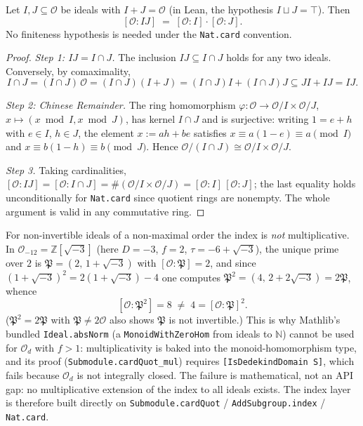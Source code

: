 \begin{proposition}\label{infra-index-mul}
  \leanok
  Let $I, J \subseteq \mathcal{O}$ be ideals with $I + J = \mathcal{O}$ (in Lean, the
  hypothesis $I \sqcup J = \top$). Then
  \[
    [\mathcal{O} : IJ] \;=\; [\mathcal{O} : I] \cdot [\mathcal{O} : J].
  \]
  No finiteness hypothesis is needed under the \texttt{Nat.card} convention.
\end{proposition}

\begin{proof}
  \emph{Step 1: $IJ = I \cap J$.} The inclusion $IJ \subseteq I \cap J$ holds for any two
  ideals. Conversely, by comaximality,
  \[
    I \cap J = (I \cap J)\,\mathcal{O} = (I \cap J)(I + J)
    = (I \cap J)I + (I \cap J)J \subseteq JI + IJ = IJ.
  \]

  \emph{Step 2: Chinese Remainder.} The ring homomorphism
  $\varphi : \mathcal{O} \to \mathcal{O}/I \times \mathcal{O}/J$,
  $x \mapsto (x \bmod I, x \bmod J)$, has kernel $I \cap J$ and is surjective: writing
  $1 = e + h$ with $e \in I$, $h \in J$, the element $x := ah + be$ satisfies
  $x \equiv a(1-e) \equiv a \pmod{I}$ and $x \equiv b(1-h) \equiv b \pmod{J}$. Hence
  $\mathcal{O}/(I \cap J) \cong \mathcal{O}/I \times \mathcal{O}/J$.

  \emph{Step 3.} Taking cardinalities,
  $[\mathcal{O} : IJ] = [\mathcal{O} : I \cap J]
  = \#(\mathcal{O}/I \times \mathcal{O}/J)
  = [\mathcal{O} : I]\,[\mathcal{O} : J]$;
  the last equality holds unconditionally for \texttt{Nat.card} since quotient rings are
  nonempty. The whole argument is valid in any commutative ring.
\end{proof}

\begin{remark}\label{infra-index-warning}
  For non-invertible ideals of a non-maximal order the index is \emph{not} multiplicative.
  In $\mathcal{O}_{-12} = \mathbb{Z}[\sqrt{-3}]$ (here $D = -3$, $f = 2$,
  $\tau = -6 + \sqrt{-3}$), the unique prime over $2$ is
  $\mathfrak{P} = (2,\, 1 + \sqrt{-3})$ with $[\mathcal{O} : \mathfrak{P}] = 2$, and since
  $(1+\sqrt{-3})^2 = 2(1+\sqrt{-3}) - 4$ one computes
  $\mathfrak{P}^2 = (4,\, 2 + 2\sqrt{-3}) = 2\mathfrak{P}$, whence
  \[
    [\mathcal{O} : \mathfrak{P}^2] = 8 \;\ne\; 4 = [\mathcal{O} : \mathfrak{P}]^2 .
  \]
  ($\mathfrak{P}^2 = 2\mathfrak{P}$ with $\mathfrak{P} \ne 2\mathcal{O}$ also shows
  $\mathfrak{P}$ is not invertible.) This is why Mathlib's bundled \texttt{Ideal.absNorm}
  (a \texttt{MonoidWithZeroHom} from ideals to $\mathbb{N}$) cannot be used for
  $\mathcal{O}_d$ with $f > 1$:
  multiplicativity is baked into the monoid-homomorphism type, and its proof
  (\texttt{Submodule.cardQuot\_mul}) requires \texttt{[IsDedekindDomain S]}, which fails
  because $\mathcal{O}_d$ is not integrally closed. The failure is mathematical, not an API
  gap: no multiplicative extension of the index to all ideals exists. The index layer is
  therefore built directly on \texttt{Submodule.cardQuot} / \texttt{AddSubgroup.index} /
  \texttt{Nat.card}.
\end{remark}

